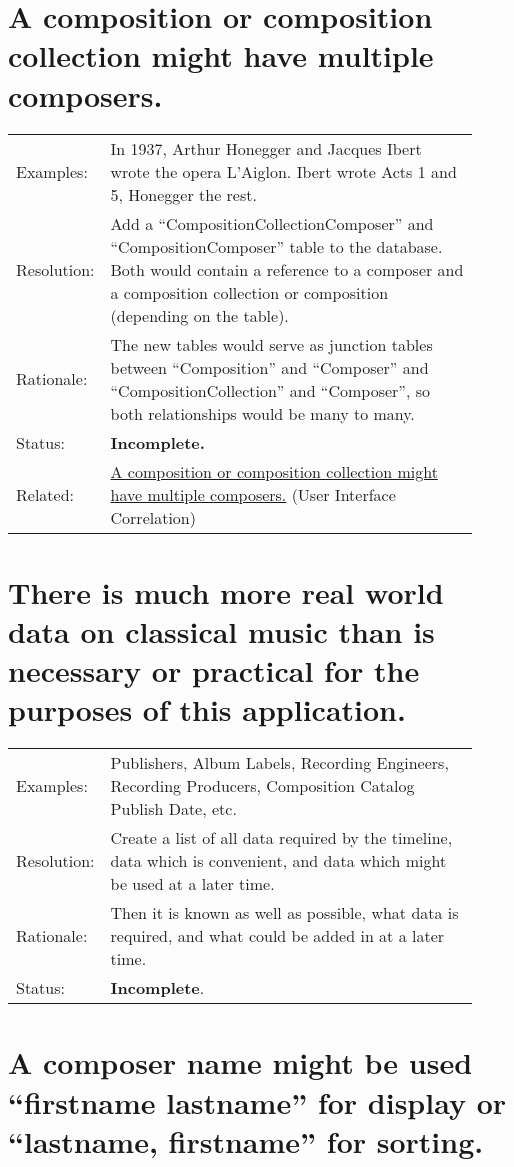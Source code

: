 \documentclass[letterpaper]{report}
\begin{document}
\section{A composition or composition collection might have multiple composers.}
\label{D.6}

\begin{tabular}{ p{0.1\linewidth} p{0.825\linewidth} }
  Examples: & In 1937, Arthur Honegger and Jacques Ibert wrote the opera L'Aiglon. Ibert wrote Acts 1 and 5, Honegger the rest. \\ 
  Resolution: & Add a ``CompositionCollectionComposer'' and ``CompositionComposer'' table to the database. Both would contain a reference to a composer and a composition collection or composition (depending on the table).  \\
  Rationale: & The new tables would serve as junction tables between ``Composition'' and ``Composer'' and ``CompositionCollection'' and ``Composer'', so both relationships would be many to many. \\
  Status: & \textbf{Incomplete.} \\
  Related: & \hyperref[UI.6]{A composition or composition collection might have multiple composers.} (User Interface Correlation)
\end{tabular}

\section{There is much more real world data on classical music than is necessary or practical for the purposes of this application.}
\label{D.7}

\begin{tabular}{ p{0.1\linewidth} p{0.825\linewidth} }
  Examples: & Publishers, Album Labels, Recording Engineers, Recording Producers, Composition Catalog Publish Date, etc. \\ 
  Resolution: & Create a list of all data required by the timeline, data which is convenient, and data which might be used at a later time. \\
  Rationale: & Then it is known as well as possible, what data is required, and what could be added in at a later time. \\
  Status: & \textbf{Incomplete}.
\end{tabular}

\section{A composer name might be used ``firstname lastname'' for display or ``lastname, firstname'' for sorting.}
\label{D.8}
\end{document}
